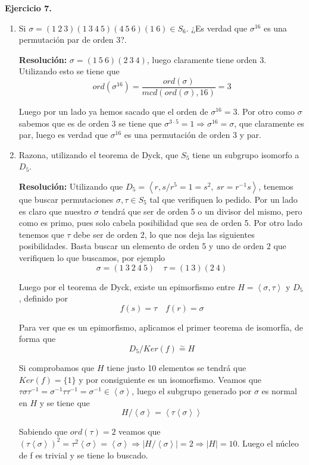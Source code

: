 \documentclass{article}
\begin{document}
\textbf{Ejercicio 7.}
\begin{enumerate}
\item Si $\sigma=(1\:2\:3)(1\:3\:4\:5)(4\:5\:6)(1\:6)\in S_6$. ¿Es verdad que $\sigma^{16}$ es una permutación par de orden 3?.

\textbf{Resolución:} $\sigma=(1\:5\:6)(2\:3\:4)$, luego claramente tiene orden 3. Utilizando esto se tiene que
\begin{equation*}
ord(\sigma^{16})=\frac{ord(\sigma)}{mcd(ord(\sigma),16)}=3
\end{equation*}

Luego por un lado ya hemos sacado que el orden de $\sigma^{16}=3$. Por otro como $\sigma$ sabemos que es de orden 3 se tiene que $\sigma^{3\cdot 5}=1\Rightarrow \sigma^{16}=\sigma$, que claramente es par, luego es verdad que $\sigma^{16}$ es una permutación de orden 3 y par.

\item Razona, utilizando el teorema de Dyck, que $S_5$ tiene un subgrupo isomorfo a $D_5$.

\textbf{Resolución:} Utilizando que $D_5=\left\langle r,s/r^5=1=s^2,\:sr=r^{-1}s\right\rangle$, tenemos que buscar permutaciones $\sigma,\tau\in S_5$ tal que verifiquen lo pedido. Por un lado es claro que nuestro $\sigma$ tendrá que ser de orden 5 o un divisor del mismo, pero como es primo, pues solo cabela posibilidad que sea de orden 5. Por otro lado tenemos que $\tau$ debe ser de orden 2, lo que nos deja las siguientes posibilidades. Basta buscar un elemento de orden 5 y uno de orden 2 que verifiquen lo que buscamos, por ejemplo
\[\sigma=(1\:3\:2\:4\:5)\quad \tau=(1\:3)(2\:4)\]

Luego por el teorema de Dyck, existe un epimorfismo entre $H=\left\langle\sigma,\tau\right\rangle$ y $D_5$, definido por
\begin{equation*}
f(s)=\tau\quad f(r)=\sigma
\end{equation*}

Para ver que es un epimorfismo, aplicamos el primer teorema de isomorfía, de forma que
\begin{equation*}
D_5/Ker(f)\overset{\sim}{=} H
\end{equation*}

Si comprobamos que $H$ tiene justo 10 elementos se tendrá que $Ker(f)=\{1\}$ y por consiguiente es un isomorfismo. Veamos que $\tau\sigma\tau^{-1}=\sigma^{-1}\tau\tau^{-1}=\sigma^{-1}\in \left\langle \sigma \right\rangle$, luego el subgrupo generado por $\sigma$ es normal en $H$ y se tiene que 
\begin{equation*}
H/\left\langle\sigma\right\rangle=\left\langle \tau\left\langle \sigma\right\rangle\right\rangle
\end{equation*}

Sabiendo que $ord(\tau)=2$ veamos que $(\tau\left\langle \sigma\right\rangle)^2=\tau^2\left\langle\sigma\right\rangle=\left\langle\sigma\right\rangle\Rightarrow |H/\left\langle\sigma\right\rangle|=2\Rightarrow |H|=10$. Luego el núcleo de f es trivial y se tiene lo buscado.
\end{enumerate}
\end{document}
